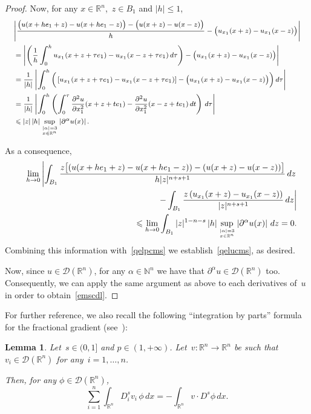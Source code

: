\documentclass[11pt,hyp,]{nyjm}
\numberwithin{equation}{section}
\newcommand{\R}{\mathbb{R}}
\newcommand{\N}{\mathbb{N}}
\newtheorem{lemma}[theorem]{Lemma}
\theoremstyle{remark}
\newcommand{\Int}{\int_{\mathbb{R}^n}}
\renewcommand{\leq}{\leqslant}
\renewcommand{\le}{\leqslant}
\begin{document}
\begin{proof}
Now, for any $x \in\R^n$,~$z\in B_1$ and $|h|\leq1$, 
\begin{equation*}\footnotesize{
\begin{split}
&\Bigg|  \frac{\big(u (x+ h e_1+z) - u (x+ h e_1-z)\big)-
\big(u(x+z)-u(x-z)\big)}{h} - \big( u_{x_1}(x+z) - u_{x_1}(x-z)  \big)\Bigg|\\
&= \left| \left( \frac{1}{h}\int_0^h u_{x_1}(x+z+\tau e_1) - u_{x_1}(x-z+\tau e_1) \, d\tau \right)  - \big(u_{x_1}(x+z) - u_{x_1}(x-z)  \big)\right|\\
&= \frac{1}{|h|} \left| \int_0^h \Big( \left[u_{x_1}(x+z+\tau e_1) - u_{x_1}(x-z+\tau e_1) \right]   - \big( u_{x_1}(x+z) - u_{x_1}(x-z)  \big)\Big) \,  d\tau \right|\\
&=  \frac{1}{|h|} \left|\int_0^h \left( \int_0^\tau\frac{\partial^2 u}{\partial x_1^2}(x+z+t e_1) - \frac{\partial^2 u}{\partial x_1^2}(x-z+t e_1)  \, dt\right) \,  d\tau \right|\\
&\leq |z| \,|h|\sup_{{|\alpha|=3}\atop{x \in \R^n} }\left|\partial^{\alpha}u(x)\right| .
\end{split}
}\end{equation*}


As a consequence, 
\begin{eqnarray*}
&&\lim_{h \to 0}\left| \int_{ B_1} \frac{z \big[(u (x+ h e_1+z) - u (x+ h e_1-z))-(u(x+z)-u(x-z))\big]}{h |z|^{n+s+1}} \, dz\right.\\&&\qquad\qquad\qquad\left. - \int_{ B_1} \frac{z \left( u_{ x_1} (x+ z) - u_{ x_1 }  (x-z)\right)}{|z|^{n+s+1}} \, dz\right|\\&&\qquad
\le\lim_{h\to0}\int_{B_1}|z|^{1-n-s} \,|h|\sup_{{|\alpha|=3}\atop{x \in \R^n} }\left|\partial^{\alpha}u(x)\right| \,dz=0.
\end{eqnarray*}
Combining this information with~\eqref{qelpcms} we establish~\eqref{qelucms}, as desired.

Now, since $u \in \mathcal{D}(\R^n)$, for any $\alpha\in\N^n$ we have that $\partial^{\alpha} u \in \mathcal{D}(\R^n)$ too. Consequently, we can apply the same argument as above to each derivatives of~$u$
in order to obtain~\eqref{emscdl}. 
\end{proof}

For further reference, we also recall the following ``integration by parts'' formula for the fractional gradient
(see~\cite[Lemma 2.2]{mora}):

\begin{lemma}\label{eduldp}
			Let~$s \in (0,1]$ and $p \in (1,+\infty)$. Let~$v: \R^n \to \R^n$ be such that~$v_i \in \mathcal{D}(\R^n)$ for any~$i=1,\ldots,n$.
			
			Then, for any $\phi \in \mathcal{D}(\R^n)$,
			\begin{equation}\sum_{i=1}^n
 			\Int D^s_i v_i\, \phi \, dx = - \Int v \cdot D^s \phi  \, dx.
			\end{equation}	
			\end{lemma}
\end{document}
